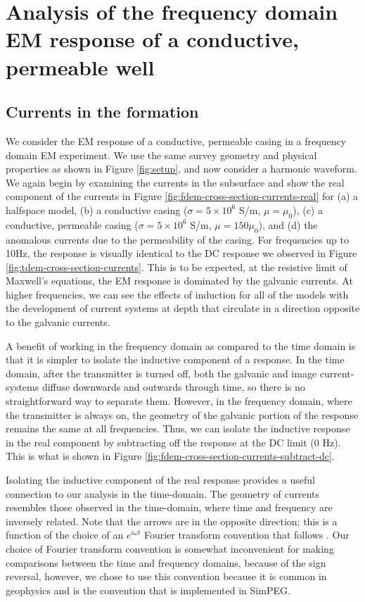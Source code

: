 \section{Analysis of the frequency domain EM response of a conductive, permeable well}
\label{app:fdem}

\subsection{Currents in the formation}
We consider the EM response of a conductive, permeable casing in a frequency domain EM experiment. We use the same survey geometry and physical properties as shown in Figure \ref{fig:setup}, and now consider a harmonic waveform. We again begin by examining the currents in the subsurface and show the real component of the currents in Figure \ref{fig:fdem-cross-section-currents-real} for (a) a halfspace model, (b) a conductive casing ($\sigma = 5\times10^6$ S/m, $\mu=\mu_0$), (c) a conductive, permeable casing ($\sigma = 5\times10^6$ S/m, $\mu=150\mu_0$), and (d) the anomalous currents due to the permeability of the casing. For frequencies up to 10Hz, the response is visually identical to the DC response we observed in Figure \ref{fig:tdem-cross-section-currents}. This is to be expected, at the resistive limit of Maxwell's equations, the EM response is dominated by the galvanic currents. At higher frequencies, we can see the effects of induction for all of the models with the development of current systems at depth that circulate in a direction opposite to the galvanic currents.




A benefit of working in the frequency domain as compared to the time domain is that it is simpler to isolate the inductive component of a response. In the time domain, after the transmitter is turned off, both the galvanic and image current-systems diffuse downwards and outwards through time, so there is no straightforward way to separate them. However, in the frequency domain, where the transmitter is always on, the geometry of the galvanic portion of the response remains the same at all frequencies. Thus, we can isolate the inductive response in the real component by subtracting off the response at the DC limit (0 Hz). This is what is shown in Figure \ref{fig:fdem-cross-section-currents-subtract-dc}.

Isolating the inductive component of the real response provides a useful connection to our analysis in the time-domain. The geometry of currents resembles those observed in the time-domain, where time and frequency are inversely related. Note that the arrows are in the opposite direction; this is a function of the choice of an $e^{i\omega t}$ Fourier transform convention that follows \citep{Ward1988}. Our choice of Fourier transform convention is somewhat inconvenient for making comparisons between the time and frequency domains, because of the sign reversal, however, we chose to use this convention because it is common in geophysics and is the convention that is implemented in SimPEG.


